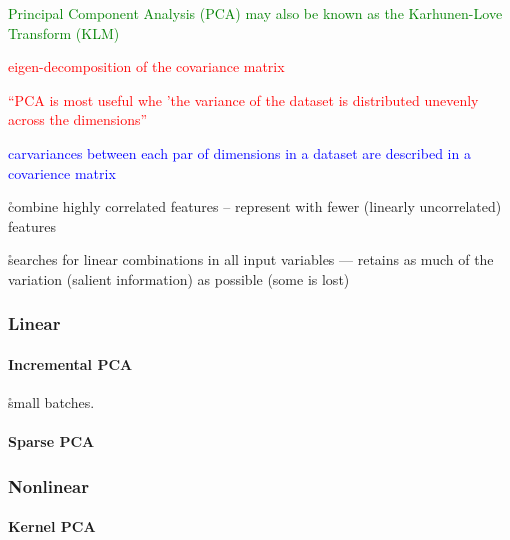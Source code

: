 \textcolor{green}{{Principal Component Analysis (PCA)} may also be known as the {Karhunen-Love Transform (KLM)} }

\textcolor{red}{eigen-decomposition of the covariance matrix}

\textcolor{red}{``PCA is most useful whe 'the variance of the dataset is distributed unevenly across the dimensions'' }

\textcolor{blue}{carvariances between each par of dimensions in a dataset are described in a {covarience matrix} }

\r{combine highly correlated features -- represent with fewer (linearly uncorrelated) features}

\r{searches for linear combinations in all input variables --- retains as much of the variation (salient information) as possible (some is lost)}



\subsubsection{Linear}

\paragraph{Incremental PCA}

\r{small batches.}

\paragraph{Sparse PCA}


\subsubsection{Nonlinear}

\paragraph{Kernel PCA}

